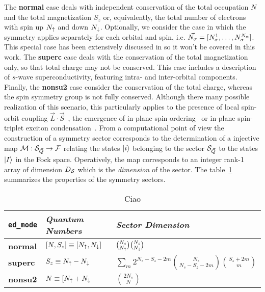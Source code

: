 \documentclass[edipack2.tex]{subfiles}
\begin{document}
The {\bf normal} case deals with independent conservation of the total occupation $N$
and the total magnetization $S_z$ or, equivalently, the total number of electrons with spin up $N_\uparrow$ and down
$N_\downarrow$. Optionally, we consider the case in which the symmetry
applies separately for each orbital and spin,
i.e. $\vec{N_\sigma}=[N^1_\sigma,\dots,N^{N_\alpha}_\sigma]$. This special case has been
extensively discussed in  so it won't be covered in
this work.
%
The {\bf superc} case deals with the conservation of the total
magnetization only, so that total charge may not be conserved. This
case includes a description of $s$-wave superconductivity, featuring
intra- and inter-orbital components.
%
Finally, the {\bf nonsu2} case consider the conservation of the total
charge, whereas the spin symmetry group is not fully
conserved. Although there many possible realization of this scenario,
this particularly applies to the presence of local spin-orbit coupling
$\vec{L}\cdot\vec{S}$~\cite{something}, the emergence of in-plane spin ordering~\cite{KM} or
in-plane spin-triplet exciton condensation~\cite{ExcitonPRB,Amaricci,Blason}.  
%
From a computational point of view the construction of a symmetry
sector corresponds to the determination of a injective map
${\cal M}:{\cal S}_{\vec{Q}}\rightarrow {\cal F}$ relating the states $|i\rangle$
belonging to the sector ${\cal S}_{\vec{Q}}$ to the states $|I\rangle$ in the
Fock space. Operatively, the map corresponds to an integer rank-1
array of dimension $D_{\cal S}$ which is the {\it dimension} of the
sector. 
The table~\ref{TabSector} summarizes the properties of the symmetry
sectors. 

\begin{table}%
  \label{TabSector}
\begin{center}
\begin{tabularx}{\linewidth}{ |X|X|X| } 
 \hline
  {\tt ed\_mode} & {\it Quantum Numbers} & {\it Sector Dimension} \\
  \hline
  {\bf normal} & $[N,S_z]\equiv[N_\uparrow,N_\downarrow]$ &
                                                $\binom{N_s}{N_\uparrow}\binom{N_s}{N_\downarrow}$
  \\
  \hline
  {\bf superc} & $S_z\equiv N_\uparrow-N_\downarrow$ &  $\sum_m 2^{N_s-S_z-2m}\binom{N_s}{N_s-S_z-2m}\binom{S_z+2m}{m}$
  \\
  \hline
  {\bf nonsu2} & $N \equiv[N_\uparrow+N_\downarrow$ & $\binom{2N_s}{N}$ \\ 
 \hline
\end{tabularx}
\end{center}
\caption{Ciao}
\end{table}
\end{document}
